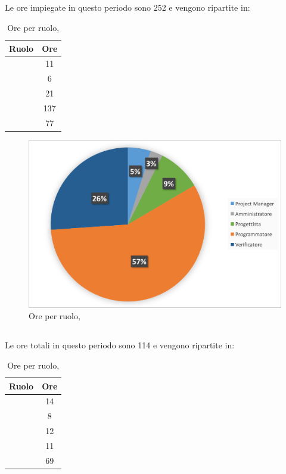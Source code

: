 \subsection{\COD}
Le ore impiegate in questo periodo sono 252 e vengono ripartite in:

\begin{table}[h]
	\begin{center}
		\begin{tabular}{|c|c|}
			\hline
			\textbf{Ruolo}	& \textbf{Ore} \\
			\hline
			\Pm &	11\\
			\hline
			\Am	&	6\\
			\hline
			\Prog		&	21\\
			\hline
			\Progr	&	137\\
			\hline
			\Ver	&	77\\
			\hline
		\end{tabular}
	\end{center}
	\caption{Ore per ruolo, \COD}
\end{table}

\begin{figure}[H]
	\centering 
	\includegraphics[scale=0.7]{Immagini/GraficiTorte/COD.png}
	\caption{Ore per ruolo, \COD}
\end{figure}
\newpage
\subsection{\VV}
Le ore totali in questo periodo sono 114 e vengono ripartite in:

\begin{table}[h]
	\begin{center}
		\begin{tabular}{|c|c|}
			\hline
			\textbf{Ruolo}	& \textbf{Ore} \\
			\hline
			\Pm &	14\\
			\hline
			\Am	&	8\\
			\hline
			\Prog		&	12\\
			\hline
			\Progr & 11\\
			\hline
			\Ver	&	69\\
			\hline
		\end{tabular}
	\end{center}
	\caption{Ore per ruolo, \VV}
\end{table}

